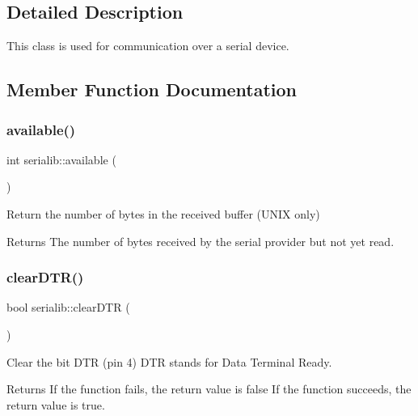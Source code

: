 \subsection{Detailed Description}
This class is used for communication over a serial device. 

\subsection{Member Function Documentation}
\mbox{\label{classserialib_a50c91bf8cab23afdfdf05ca58392456f}} 
\subsubsection{\texorpdfstring{available()}{available()}}
{\footnotesize\ttfamily int serialib\+::available (\begin{DoxyParamCaption}{ }\end{DoxyParamCaption})}



Return the number of bytes in the received buffer (U\+N\+IX only) 

\begin{DoxyReturn}{Returns}
The number of bytes received by the serial provider but not yet read. 
\end{DoxyReturn}
\mbox{\label{classserialib_adf49bff6401d3101b41fb52e98309635}} 
\subsubsection{\texorpdfstring{clear\+D\+T\+R()}{clearDTR()}}
{\footnotesize\ttfamily bool serialib\+::clear\+D\+TR (\begin{DoxyParamCaption}{ }\end{DoxyParamCaption})}



Clear the bit D\+TR (pin 4) D\+TR stands for Data Terminal Ready. 

\begin{DoxyReturn}{Returns}
If the function fails, the return value is false If the function succeeds, the return value is true. 
\end{DoxyReturn}
\mbox{\label{classserialib_ab0b5882339240002fccf7701f5321e0a}} 
